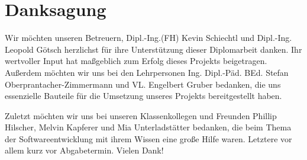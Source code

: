 \chapter*{Danksagung}

Wir möchten unseren Betreuern, Dipl.-Ing.(FH) Kevin Schiechtl und Dipl.-Ing. Leopold Götsch herzlichst 
für ihre Unterstützung dieser Diplomarbeit danken. Ihr wertvoller Input hat maßgeblich zum Erfolg dieses Projekts 
beigetragen. Außerdem möchten wir uns bei den Lehrpersonen Ing. Dipl.-Päd. BEd. Stefan Oberprantacher-Zimmermann 
und VL. Engelbert Gruber bedanken, die uns essenzielle Bauteile für die Umsetzung unseres Projekts 
bereitgestellt haben.

Zuletzt möchten wir uns bei unseren Klassenkollegen und Freunden Phillip Hilscher, Melvin Kapferer und Mia 
Unterladstätter bedanken, die beim Thema der Softwareentwicklung mit ihrem Wissen eine große Hilfe waren. 
Letztere vor allem kurz vor Abgabetermin. Vielen Dank!